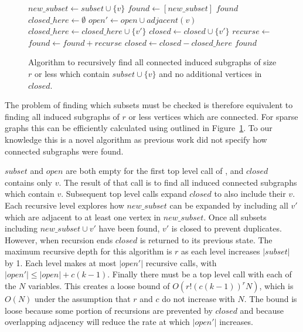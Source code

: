 \begin{figure}
  \begin{algorithmic}[1]
    \State $new\_subset \leftarrow subset \cup \{v\}$
    \State $found \leftarrow [new\_subset]$
      \Return $found$
    \EndIf
    \State $closed\_here \leftarrow \emptyset$
    \State $open' \leftarrow open \cup adjacent(v)$
        \State $closed\_here \leftarrow closed\_here \cup \{v'\}$
        \State $closed \leftarrow closed \cup \{v'\}$
        \State $recurse \leftarrow $
        \State $found \leftarrow found + recurse$
      \EndIf
    \EndFor
    \State $closed \leftarrow closed - closed\_here$
    \State \Return $found$
  \EndProcedure
\end{algorithmic}
  \caption{Algorithm to recursively find all connected induced subgraphs of size $r$ or less which
           contain $subset \cup \{v\}$ and no additional vertices in $closed$.}
  \label{fig-connected-subgraphs}
\end{figure}

The problem of finding which subsets must be checked is therefore equivalent to
finding all induced subgraphs of $r$ or less vertices which are connected. For sparse
graphs this can be efficiently calculated using  outlined
in Figure~\ref{fig-connected-subgraphs}. To our knowledge this is a novel algorithm
as previous work did not specify how connected subgraphs were found.

$subset$ and $open$ are both empty for the first top level call of , and
$closed$ contains only $v$.
The result of that call is to find all induced connected subgraphs which contain $v$.
Subsequent top level calls expand $closed$ to also include their $v$.
Each recursive level explores how $new\_subset$ can be expanded by including all $v'$ which are adjacent
to at least one vertex in $new\_subset$. Once all subsets including $new\_subset \cup v'$ have been found,
$v'$ is closed to prevent duplicates. However, when recursion ends $closed$ is returned to its previous state.
The maximum recursive depth for this algorithm is $r$ as each level increases $|subset|$ by 1. Each level
makes at most $|open'|$ recursive calls, with $|open'| \leq |open| + c(k-1)$. Finally there must be a top level
call with each of the $N$ variables. This creates a loose bound of $O(r!(c(k-1))^rN)$, which is $O(N)$ under the
assumption that $r$ and $c$ do not increase with $N$. The bound is loose because some portion of recursions
are prevented by $closed$ and because overlapping adjacency will reduce the rate at which $|open'|$ increases.

